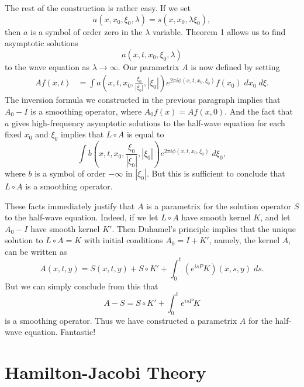 \documentclass{article}
\theoremstyle{plain}
\theoremstyle{remark}
\theoremstyle{definition}
\begin{document}
The rest of the construction is rather easy. If we set
%
\[ a(x,x_0,\xi_0,\lambda) = s( x, x_0, \lambda \xi_0 ), \]
%
then $a$ is a symbol of order zero in the $\lambda$ variable. Theorem 1 allows us to find asymptotic solutions
%
\[ a(x,t,x_0,\xi_0,\lambda) \]
%
to the wave equation as $\lambda \to \infty$. Our parametrix $A$ is now defined by setting
%
\begin{align*}
	Af(x,t) &= \int a \left( x, t, x_0, \frac{\xi_0}{|\xi_0|} , |\xi_0| \right) e^{2 \pi i \phi(x,t,x_0,\xi_0)} f(x_0)\; dx_0\; d\xi.
\end{align*}
%
The inversion formula we constructed in the previous paragraph implies that $A_0 - I$ is a smoothing operator, where $A_0 f(x) = Af(x,0)$. And the fact that $a$ gives high-frequency asymptotic solutions to the half-wave equation for each fixed $x_0$ and $\xi_0$ implies that $L \circ A$ is equal to
%
\[ \int b \left( x, t, x_0, \frac{\xi_0}{|\xi_0|} , |\xi_0| \right) e^{2 \pi i \phi(x,t,x_0,\xi_0)}\; d\xi_0, \]
%
where $b$ is a symbol of order $-\infty$ in $|\xi_0|$. But this is sufficient to conclude that $L \circ A$ is a smoothing operator.

These facts immediately justify that $A$ is a parametrix for the solution operator $S$ to the half-wave equation. Indeed, if we let $L \circ A$ have smooth kernel $K$, and let $A_0 - I$ have smooth kernel $K'$. Then Duhamel's principle implies that the unique solution to $L \circ A = K$ with initial conditions $A_0 = I + K'$, namely, the kernel $A$, can be written as
%
\[ A(x,t,y) = S(x,t,y) + S \circ K' + \int_0^t (e^{isP} K)(x,s,y)\; ds. \]
%
But we can simply conclude from this that
%
\[ A - S = S \circ K' + \int_0^t e^{isP} K \]
%
is a smoothing operator. Thus we have constructed a parametrix $A$ for the half-wave equation. Fantastic!

\section{Hamilton-Jacobi Theory}
\end{document}
